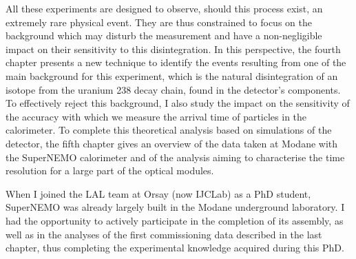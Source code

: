 All these experiments are designed to observe, should this process exist, an extremely rare physical event.
They are thus constrained to focus on the background which may disturb the measurement and have a non-negligible impact on their sensitivity to this disintegration.
In this perspective, the fourth chapter presents a new technique to identify the events resulting from one of the main background for this experiment, which is the natural disintegration of an isotope from the uranium 238 decay chain, found in the detector's components.
To effectively reject this background, I also study the impact on the sensitivity of the accuracy with which we measure the arrival time of particles in the calorimeter.
To complete this theoretical analysis based on simulations of the detector, the fifth chapter gives an overview of the data taken at Modane with the SuperNEMO calorimeter and of the analysis aiming to characterise the time resolution for a large part of the optical modules.

When I joined the LAL team at Orsay (now IJCLab) as a PhD student, SuperNEMO was already largely built in the Modane underground laboratory.
I had the opportunity to actively participate in the completion of its assembly, as well as in the analyses of the first commissioning data described in the last chapter, thus completing the experimental knowledge acquired during this PhD.
